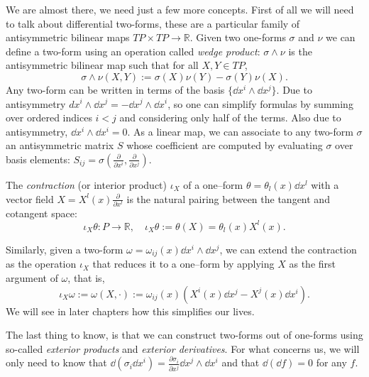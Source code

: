 \documentclass[english,fontsize=11pt,paper=b5]{scrbook}
\theoremstyle{definition}
\begin{document}
    We are almost there, we need just a few more concepts.
    First of all we will need to talk about differential two-forms, these are a particular family of antisymmetric bilinear maps $TP \times TP \to \mathbb{R}$.
    Given two one-forms $\sigma$ and $\nu$ we can define a two-form using an operation called \emph{wedge product}: $\sigma\wedge\nu$ is the antisymmetric bilinear map such that for all $X,Y \in TP$,
    \begin{equation}
      \sigma\wedge\nu(X,Y) := \sigma(X)\nu(Y) - \sigma(Y)\nu(X).
    \end{equation}
    Any two-form can be written in terms of the basis $\{\dd x^i\wedge \dd x^j\}$. Due to antisymmetry $dx^i \wedge \dd x^j = - \dd x^j \wedge \dd x^i$, so one can simplify formulas by summing over ordered indices $i<j$ and considering only half of the terms. Also due to antisymmetry, $\dd x^i \wedge \dd x^i = 0$. As a linear map, we can associate to any two-form $\sigma$ an antisymmetric matrix $S$ whose coefficient are computed by evaluating $\sigma$ over basis elements: $S_{ij} = \sigma\left(\frac{\partial}{\partial x^i}, \frac{\partial}{\partial x^j}\right)$.

    The \emph{contraction} (or interior product) $\iota_X$ of a one--form $\theta = \theta_l(x)\dd x^l$ with a vector field $X = X^l(x)\frac{\partial}{\partial x^l}$ is the natural pairing between the tangent and cotangent space:
    \begin{equation}
      \iota_X \theta : P \to \mathbb{R}, \quad \iota_X \theta := \theta(X) = \theta_l(x) X^l(x).
    \end{equation}

    Similarly, given a two-form $\omega = \omega_{ij}(x) \dd x^i\wedge \dd x^j$, we can extend the contraction as the operation $\iota_X$ that reduces it to a one--form by applying $X$ as the first argument of $\omega$, that is,
    \begin{equation}\label{eq:contraction}
      \iota_X \omega := \omega(X, \cdot) := \omega_{ij}(x)(X^i(x) \dd x^j - X^j(x) \dd x^i).
    \end{equation}
    We will see in later chapters how this simplifies our lives.

    The last thing to know, is that we can construct two-forms out of one-forms using so-called \emph{exterior products} and \emph{exterior derivatives}.
    For what concerns us, we will only need to know that $\dd (\sigma_i \dd x^i) = \frac{\partial \sigma_i}{\partial x^j} \dd x^j \wedge \dd x^i$ and that $\dd (\dd f) = 0$ for any $f$.
\end{document}
